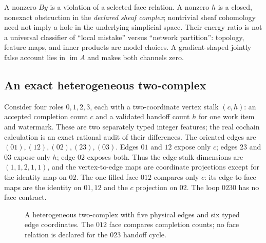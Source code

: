 \documentclass[11pt,a4paper]{article}
\begin{document}
A nonzero $By$ is a violation of a selected face relation. A nonzero $h$ is a closed, nonexact obstruction in the \emph{declared sheaf complex}; nontrivial sheaf cohomology need not imply a hole in the underlying simplicial space. Their energy ratio is not a universal classifier of ``local mistake'' versus ``network partition'': topology, feature maps, and inner products are model choices. A gradient-shaped jointly false account lies in $\operatorname{im}A$ and makes both channels zero.

\subsection{An exact heterogeneous two-complex}\label{sec:typed-fixture}
Consider four roles $0,1,2,3$, each with a two-coordinate vertex stalk $(c,h)$: an accepted completion count $c$ and a validated handoff count $h$ for one work item and watermark. These are two separately typed integer features; the real cochain calculation is an exact rational audit of their differences. The oriented edges are $(01),(12),(02),(23),(03)$. Edges $01$ and $12$ expose only $c$; edges $23$ and $03$ expose only $h$; edge $02$ exposes both. Thus the edge stalk dimensions are $(1,1,2,1,1)$, and the vertex-to-edge maps are coordinate projections except for the identity map on $02$. The one filled face $012$ compares only $c$: its edge-to-face maps are the identity on $01,12$ and the $c$ projection on $02$. The loop $0230$ has no face contract.

\begin{figure}[H]
\centering
{}
\caption{A heterogeneous two-complex with five physical edges and six typed edge coordinates. The $012$ face compares completion counts; no face relation is declared for the $023$ handoff cycle.}
\label{fig:typed-complex}
\end{figure}
\end{document}
